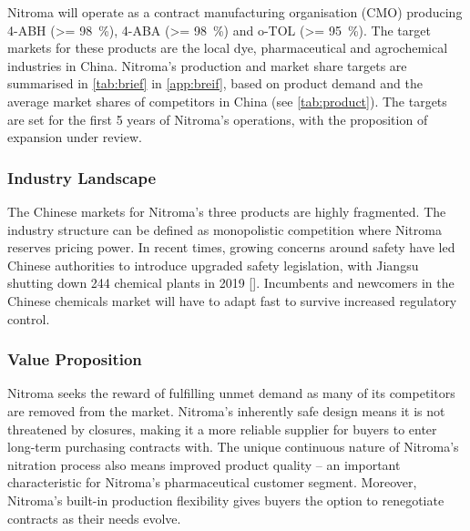 Nitroma will operate as a contract manufacturing organisation (CMO) producing 4-ABH (\SI{>= 98}{\percent}), 4-ABA (\SI{>= 98}{\percent}) and o-TOL (\SI{>= 95}{\percent}). The target markets for these products are the local dye, pharmaceutical and agrochemical industries in China. Nitroma’s production and market share targets are summarised in \cref{tab:brief} in \cref{app:breif}, based on product demand and the average market shares of competitors in China (see \cref{tab:product}). The targets are set for the first 5 years of Nitroma’s operations, with the proposition of expansion under review.


\subsubsection{Industry Landscape}
The Chinese markets for Nitroma’s three products are highly fragmented. The industry structure can be defined as monopolistic competition where Nitroma reserves pricing power. In recent times, growing concerns around safety have led Chinese authorities to introduce upgraded safety legislation, with Jiangsu shutting down 244 chemical plants in 2019 []. Incumbents and newcomers in the Chinese chemicals market will have to adapt fast to survive increased regulatory control.


\subsubsection{Value Proposition}
Nitroma seeks the reward of fulfilling unmet demand as many of its competitors are removed from the market. Nitroma’s inherently safe design means it is not threatened by closures, making it a more reliable supplier for buyers to enter long-term purchasing contracts with. The unique continuous nature of Nitroma’s nitration process also means improved product quality – an important characteristic for Nitroma’s pharmaceutical customer segment. Moreover, Nitroma’s built-in production flexibility gives buyers the option to renegotiate contracts as their needs evolve. %

